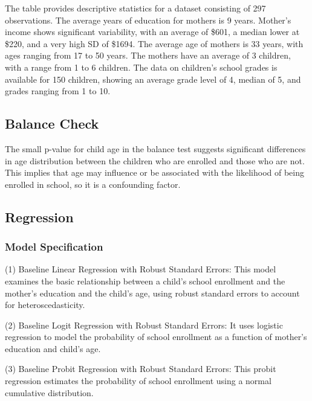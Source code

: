 \documentclass[10pt]{article}
\begin{document}
The table provides descriptive statistics for a dataset consisting of 297 observations. The average years of education for mothers is 9 years. Mother's income shows significant variability, with an average of \$601, a median lower at \$220, and a very high SD of \$1694. The average age of mothers is 33 years, with ages ranging from 17 to 50 years. The mothers have an average of 3 children, with a range from 1 to 6 children. The data on children's school grades is available for 150 children, showing an average grade level of 4, median of 5, and grades ranging from 1 to 10.


\subsection{Balance Check}
\begin{center}
    
\end{center}
The small p-value for child age in the balance test suggests significant differences in age distribution between the children who are enrolled and those who are not. This implies that age may influence or be associated with the likelihood of being enrolled in school, so it is a confounding factor.

\newpage
\subsection{Regression}
\begin{center}
    
\end{center}

\newpage

\subsubsection{Model Specification}
(1) Baseline Linear Regression with Robust Standard Errors: This model examines the basic relationship between a child's school enrollment and the mother's education and the child's age, using robust standard errors to account for heteroscedasticity.

(2) Baseline Logit Regression with Robust Standard Errors: It uses logistic regression to model the probability of school enrollment as a function of mother's education and child's age.

(3) Baseline Probit Regression with Robust Standard Errors: This probit regression estimates the probability of school enrollment using a normal cumulative distribution.
\end{document}
